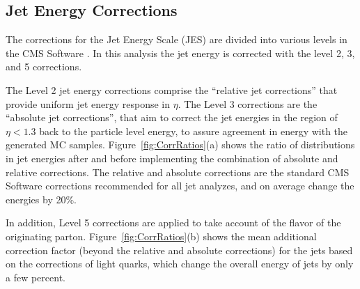 
\subsection{Jet Energy Corrections}

The corrections for the Jet Energy Scale (JES) are divided into various levels in the CMS Software \cite{JES}.  
In this analysis the jet energy is corrected with the level 2, 3, and 5 corrections.

The Level 2 jet energy corrections comprise the 
``relative jet corrections'' that provide uniform jet energy response in $\eta$.  
The Level 3 corrections are the ``absolute jet corrections'', that aim to correct  the jet energies in the 
region of $\eta < 1.3$ back to the particle level energy, to assure agreement in energy with the generated MC samples. 
Figure~\ref{fig:CorrRatios}(a) shows the ratio of distributions in jet energies after and before implementing  
the combination of absolute and relative corrections.  
The relative and absolute corrections are the standard CMS Software corrections recommended for all jet analyzes,
and on average change the energies by 20\%.

In addition, Level 5 corrections are applied to take account of the flavor of the originating parton.
Figure~\ref{fig:CorrRatios}(b) shows the mean additional correction factor (beyond the relative and absolute corrections) 
for the jets based on the corrections of light quarks, which change the overall energy of jets by only a few percent.

